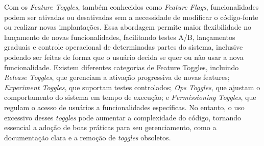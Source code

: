 Com os \emph{Feature Toggles}, também conhecidos como \emph{Feature Flags}, funcionalidades podem ser ativadas ou desativadas sem a necessidade de modificar o código-fonte ou realizar novas implantações. Essa abordagem permite maior flexibilidade no lançamento de novas funcionalidades, facilitando testes A/B, lançamentos graduais e controle operacional de determinadas partes do sistema, inclusive podendo ser feitas de forma que o usuário decida se quer ou não usar a nova funcionalidade. Existem diferentes categorias de Feature Toggles, incluindo \emph{Release Toggles}, que gerenciam a ativação progressiva de novas features; \emph{Experiment Toggles}, que suportam testes controlados; \emph{Ops Toggles}, que ajustam o comportamento do sistema em tempo de execução; e \emph{Permissioning Toggles}, que regulam o acesso de usuários a funcionalidades específicas. No entanto, o uso excessivo desses \emph{toggles} pode aumentar a complexidade do código, tornando essencial a adoção de boas práticas para seu gerenciamento, como a documentação clara e a remoção de \emph{toggles} obsoletos.
\cite{feature-toggles}



